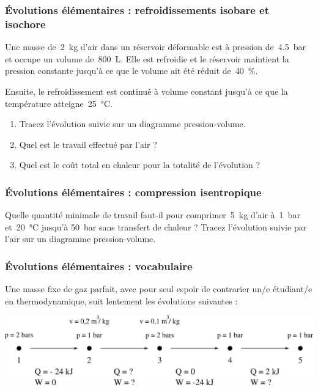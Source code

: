 \subsubsection{Évolutions élémentaires : refroidissements isobare et isochore}
\label{exo_gp_isobare_isochore}
\wherefrom{[DS n°2 2010, 5pts]}

	Une masse de~\SI{2}{\kilogram} d’air dans un réservoir déformable est à pression de~\SI{4,5}{\bar} et occupe un volume de~\SI{800}{\liter}. Elle est refroidie et le réservoir maintient la pression constante jusqu’à ce que le volume ait été réduit de~\SI{40}{\percent}.
	
	Ensuite, le refroidissement est continué à volume constant jusqu’à ce que la température atteigne~\SI{25}{\degreeCelsius}.
	
	\begin{enumerate}
		\item Tracez l’évolution suivie sur un diagramme pression-volume.
		\item Quel est le travail effectué par l’air ?
		\item Quel est le coût total en chaleur pour la totalité de l’évolution ?
	\end{enumerate}


\subsubsection{Évolutions élémentaires : compression isentropique}
\label{exo_gp_isentropique}
	
	Quelle quantité minimale de travail faut-il pour comprimer~\SI{5}{\kilogram} d’air à~\SI{1}{\bar} et~\SI{20}{\degreeCelsius} jusqu’à \SI{50}{\bar} sans transfert de chaleur ? Tracez l’évolution suivie par l’air sur un diagramme pression-volume.


\subsubsection{Évolutions élémentaires : vocabulaire}
\label{exo_bete_mechant}
\wherefrom{[DS n°2 2010, 2pts]}

	Une masse fixe de gaz parfait, avec pour seul espoir de contrarier un/e étudiant/e en thermodynamique, suit lentement les évolutions suivantes :

		\begin{center}
			\includegraphics[width=\textwidth]{images/exo_elementaires.png}
		\end{center}

